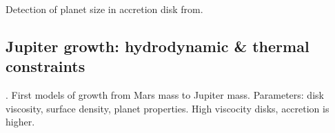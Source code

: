 \documentclass[12pt]{article} %
\begin{document}
Detection of planet size in accretion disk from\cite{bate2003three}.\newline

\subsection{Jupiter growth: hydrodynamic \& thermal constraints}\vspace{-1ex}\bigskip

\cite{lissauer2009models}. First models of growth from Mars mass to Jupiter mass. Parameters: disk viscosity, surface density, planet properties.\newline
High viscocity disks, accretion is higher.



\newpage

\end{document}
